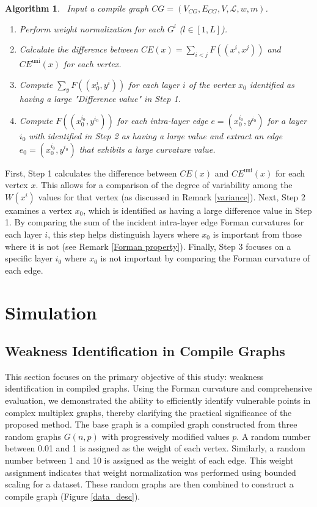 \documentclass[preprint,12pt,number]{elsarticle}
\theoremstyle{plain} %
\newtheorem{claim}{\indent\sc Algorithm}
\theoremstyle{definition} %
\begin{document}
\begin{claim}\ 
Input a compile graph $CG = (V_{CG}, E_{CG}, V, \mathcal{L}, w, m)$.
\begin{enumerate}[label=\textbf{Step \arabic*.}]
    \item Perform weight normalization for each $G^l$ ($l \in [1, L]$).
    \item Calculate the difference between $CE(x) = \sum_{i<j} F((x^i,x^j))$ and $CE^\text{uni}(x)$ for each vertex.
    \item Compute $\sum_{y}F((x_0^i,y^i))$ for each layer $i$ of the vertex $x_0$ identified as having a large "Difference value" in Step 1.
    \item Compute $F((x_0^{i_0},y^{i_0}))$ for each intra-layer edge $e=(x_0^{i_0},y^{i_0})$ for a layer $i_0$ with identified in Step 2 as having a large value and extract an edge $e_0=(x_0^{i_0},y^{i_0})$ that exhibits a large curvature value.
\end{enumerate}
\end{claim}

First, Step 1 calculates the difference between $CE(x)$ and $CE^\text{uni}(x)$ for each vertex $x$. This allows for a comparison of the degree of variability among the $W(x^i)$ values for that vertex (as discussed in Remark \ref{variance}). Next, Step 2 examines a vertex $x_0$, which is identified as having a large difference value in Step 1. By comparing the sum of the incident intra-layer edge Forman curvatures for each layer $i$, this step helps distinguish layers where $x_0$ is important from those where it is not (see Remark \ref{Forman property}). Finally, Step 3 focuses on a specific layer $i_0$ where $x_0$ is not important  by comparing the Forman curvature of each edge.

\section{Simulation}
\subsection{Weakness Identification in Compile Graphs}
This section focuses on the primary objective of this study: weakness identification in compiled graphs. Using the Forman curvature and comprehensive evaluation, we demonstrated the ability to efficiently identify vulnerable points in complex multiplex graphs, thereby clarifying the practical significance of the proposed method. The base graph is a compiled graph constructed from three random graphs $G(n,p)$ with progressively modified values $p$. A random number between 0.01 and 1 is assigned as the weight of each vertex. Similarly, a random number between 1 and 10 is assigned as the weight of each edge. This weight assignment indicates that weight normalization was performed using bounded scaling for a dataset. These random graphs are then combined to construct a compile graph (Figure \ref{data_desc}).
\end{document}
